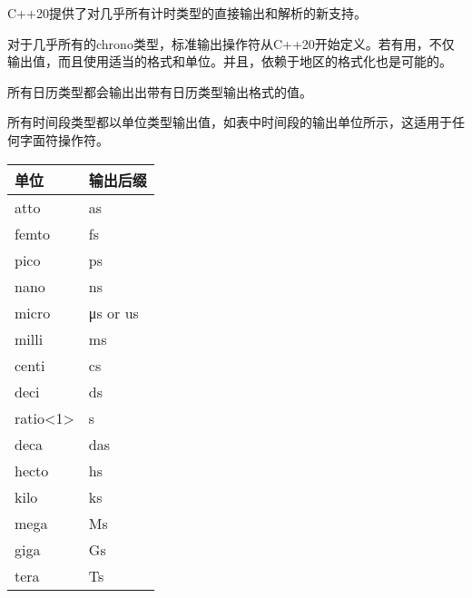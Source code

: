 
C++20提供了对几乎所有计时类型的直接输出和解析的新支持。


对于几乎所有的chrono类型，标准输出操作符从C++20开始定义。若有用，不仅输出值，而且使用适当的格式和单位。并且，依赖于地区的格式化也是可能的。

所有日历类型都会输出出带有日历类型输出格式的值。

所有时间段类型都以单位类型输出值，如表中时间段的输出单位所示，这适用于任何字面符操作符。

\begin{longtable}[c]{|l|l|}
\hline
\textbf{单位}                          & \textbf{输出后缀} \\ \hline
\endfirsthead
%
\endhead
%
atto                                   & as                     \\ \hline
femto                                  & fs                     \\ \hline
pico                                   & ps                     \\ \hline
nano                                   & ns                     \\ \hline
micro                                  & μs or us               \\ \hline
milli                                  & ms                     \\ \hline
centi                                  & cs                     \\ \hline
deci                                   & ds                     \\ \hline
ratio\textless{}1\textgreater{}        & s                      \\ \hline
deca                                   & das                    \\ \hline
hecto                                  & hs                     \\ \hline
kilo                                   & ks                     \\ \hline
mega                                   & Ms                     \\ \hline
giga                                   & Gs                     \\ \hline
tera                                   & Ts                     \\ \hline

\end{longtable}
